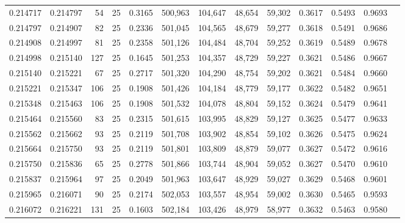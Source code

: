 \begin{tabular}{rrrrrrrrrrrrr}
0.214717 & 0.214797 &    54 &  25 &                                     0.3165 & 500,963 & 104,647 &  48,654 &  59,302 & 0.3617 & 0.5493 & 0.9693 \\
0.214797 & 0.214907 &    82 &  25 &                                     0.2336 & 501,045 & 104,565 &  48,679 &  59,277 & 0.3618 & 0.5491 & 0.9686 \\
0.214908 & 0.214997 &    81 &  25 &                                     0.2358 & 501,126 & 104,484 &  48,704 &  59,252 & 0.3619 & 0.5489 & 0.9678 \\
0.214998 & 0.215140 &   127 &  25 &                                     0.1645 & 501,253 & 104,357 &  48,729 &  59,227 & 0.3621 & 0.5486 & 0.9667 \\
0.215140 & 0.215221 &    67 &  25 &                                     0.2717 & 501,320 & 104,290 &  48,754 &  59,202 & 0.3621 & 0.5484 & 0.9660 \\
0.215221 & 0.215347 &   106 &  25 &                                     0.1908 & 501,426 & 104,184 &  48,779 &  59,177 & 0.3622 & 0.5482 & 0.9651 \\
0.215348 & 0.215463 &   106 &  25 &                                     0.1908 & 501,532 & 104,078 &  48,804 &  59,152 & 0.3624 & 0.5479 & 0.9641 \\
0.215464 & 0.215560 &    83 &  25 &                                     0.2315 & 501,615 & 103,995 &  48,829 &  59,127 & 0.3625 & 0.5477 & 0.9633 \\
0.215562 & 0.215662 &    93 &  25 &                                     0.2119 & 501,708 & 103,902 &  48,854 &  59,102 & 0.3626 & 0.5475 & 0.9624 \\
0.215664 & 0.215750 &    93 &  25 &                                     0.2119 & 501,801 & 103,809 &  48,879 &  59,077 & 0.3627 & 0.5472 & 0.9616 \\
0.215750 & 0.215836 &    65 &  25 &                                     0.2778 & 501,866 & 103,744 &  48,904 &  59,052 & 0.3627 & 0.5470 & 0.9610 \\
0.215837 & 0.215964 &    97 &  25 &                                     0.2049 & 501,963 & 103,647 &  48,929 &  59,027 & 0.3629 & 0.5468 & 0.9601 \\
0.215965 & 0.216071 &    90 &  25 &                                     0.2174 & 502,053 & 103,557 &  48,954 &  59,002 & 0.3630 & 0.5465 & 0.9593 \\
0.216072 & 0.216221 &   131 &  25 &                                     0.1603 & 502,184 & 103,426 &  48,979 &  58,977 & 0.3632 & 0.5463 & 0.9580 \\

\end{tabular}
